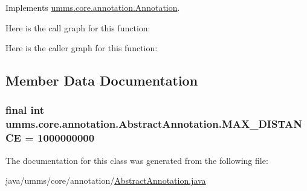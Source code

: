 Implements \hyperlink{interfaceumms_1_1core_1_1annotation_1_1_annotation_a5542af76653dcba00bf9484a08039a3c}{umms.\+core.\+annotation.\+Annotation}.



Here is the call graph for this function\+:




Here is the caller graph for this function\+:




\subsection{Member Data Documentation}
\hypertarget{classumms_1_1core_1_1annotation_1_1_abstract_annotation_a9f0100c80a38a43744dbe3eb36446be6}{
\subsubsection[{M\+A\+X\+\_\+\+D\+I\+S\+T\+A\+N\+C\+E}]{\setlength{\rightskip}{0pt plus 5cm}final int umms.\+core.\+annotation.\+Abstract\+Annotation.\+M\+A\+X\+\_\+\+D\+I\+S\+T\+A\+N\+C\+E = 1000000000\hspace{0.3cm}{\ttfamily [static]}}}\label{classumms_1_1core_1_1annotation_1_1_abstract_annotation_a9f0100c80a38a43744dbe3eb36446be6}


The documentation for this class was generated from the following file\+:\begin{DoxyCompactItemize}
\item 
java/umms/core/annotation/\hyperlink{_abstract_annotation_8java}{Abstract\+Annotation.\+java}\end{DoxyCompactItemize}
